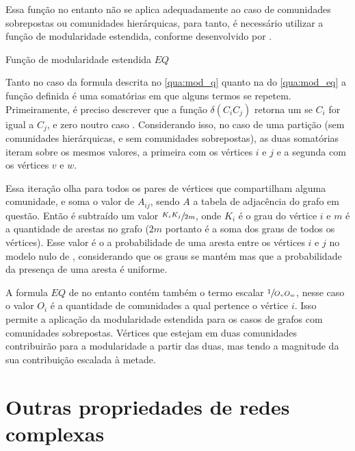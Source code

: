 \documentclass[notes.tex]{subfiles}
\begin{document}
Essa função no entanto não se aplica adequadamente ao caso de comunidades sobrepostas ou comunidades hierárquicas, para tanto, é necessário utilizar a função de modularidade estendida, conforme desenvolvido por .

\begin{quadro}[htb]
\caption{\label{qua:mod_eq}Função de modularidade estendida $EQ$}

    \begin{equasion}
    \end{equasion}

\end{quadro}

Tanto no caso da formula descrita no \autoref{qua:mod_q} quanto na do \autoref{qua:mod_eq} a função definida é uma somatórias em que alguns termos se repetem.
Primeiramente, é preciso descrever que a função $\delta(C_iC_j)$ retorna um se $C_i$ for igual a  $C_j$, e zero noutro caso \cite{fortunato2010community}.
Considerando isso, no caso de uma partição (sem comunidades hierárquicas, e sem comunidades sobrepostas), as duas somatórias iteram sobre os mesmos valores, a primeira com os vértices $i$ e $j$ e a segunda com os vértices $v$ e  $w$.

Essa iteração olha para todos os pares de vértices que compartilham alguma comunidade, e soma o valor de $A_{ij}$, sendo $A$ a tabela de adjacência do grafo em questão.
Então é subtraído um valor $\sfrac{K_iK_j}{2m}$, onde  $K_i$ é o grau do vértice $i$ e  $m$ é a quantidade de arestas no grafo ($2m$ portanto é a soma dos graus de todos os vértices).
Esse valor é o a probabilidade de uma aresta entre os vértices  $i$ e  $j$ no modelo nulo de , considerando que os graus se mantém mas que a probabilidade da presença de uma aresta é uniforme.

A formula $EQ$ de  no entanto contém também o termo escalar $\sfrac{1}{O_vO_w}$, nesse caso o valor $O_i$ é a quantidade de comunidades a qual pertence o vértice $i$.
Isso permite a aplicação da modularidade estendida para os casos de grafos com comunidades sobrepostas.
Vértices que estejam em duas comunidades contribuirão para a modularidade a partir das duas, mas tendo a magnitude da sua contribuição escalada à metade.

\section{Outras propriedades de redes complexas}
\end{document}
